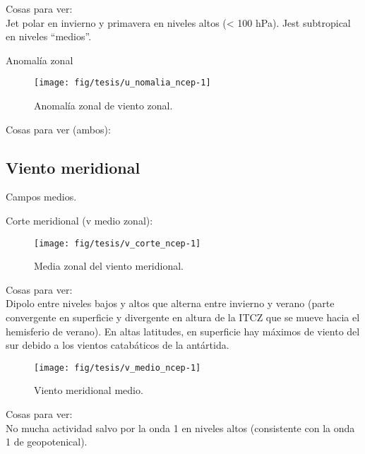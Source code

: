 \documentclass[spanish,a4paper]{book}
\begin{document}
Cosas para ver:\\
Jet polar en invierno y primavera en niveles altos (\textless{} 100
hPa). Jest subtropical en niveles ``medios''.

Anomalía zonal

\begin{figure}

{\centering \texttt{[image: fig/tesis/u\_nomalia\_ncep-1]} 

}

\caption{Anomalía zonal de viento zonal.}\label{fig:u_nomalia_ncep}
\end{figure}

Cosas para ver (ambos):

\subsection{Viento meridional}\label{viento-meridional}

Campos medios.

Corte meridional (v medio zonal):

\begin{figure}

{\centering \texttt{[image: fig/tesis/v\_corte\_ncep-1]} 

}

\caption{Media zonal del viento meridional.}\label{fig:v_corte_ncep}
\end{figure}

Cosas para ver:\\
Dipolo entre niveles bajos y altos que alterna entre invierno y verano
(parte convergente en superficie y divergente en altura de la ITCZ que
se mueve hacia el hemisferio de verano). En altas latitudes, en
superficie hay máximos de viento del sur debido a los vientos
catabáticos de la antártida.

\begin{figure}

{\centering \texttt{[image: fig/tesis/v\_medio\_ncep-1]} 

}

\caption{Viento meridional medio.}\label{fig:v_medio_ncep}
\end{figure}

Cosas para ver:\\
No mucha actividad salvo por la onda 1 en niveles altos (consistente con
la onda 1 de geopotenical).
\end{document}
